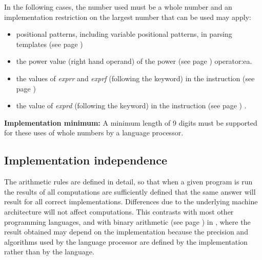 In the following cases, the number used must be a whole number and
an implementation restriction on the largest number that can be used
may apply:
\begin{itemize}
\item positional patterns, including variable positional patterns,
in  parsing templates (see page \pageref{refparsing}) 
\item the power value (right hand operand) of the  power (see page \pageref{refpower}) 
operator:ea.
\item the values of \emph{exprr} and \emph{exprf} (following the
 keyword) in the   instruction (see page \pageref{refloop}) 
\item the value of \emph{exprd} (following the 
keyword) in the   instruction (see page \pageref{refnumeric}) .
\end{itemize}
 \textbf{Implementation minimum:} A minimum length of 9 digits must
be supported for these uses of whole numbers by a \nr{} language
processor.
\subsection{Implementation independence}
 The \nr{} arithmetic rules are defined in detail, so that when a
given program is run the results of all computations are sufficiently
defined that the same answer will result for all correct
implementations.  Differences due to the underlying machine
architecture will not affect computations.
 This contrasts with most other programming languages, and with
 binary arithmetic (see page \pageref{refbinary})  in \nr{}, where the
result obtained may depend on the implementation because the precision
and algorithms used by the language processor are defined by the
implementation rather than by the language.
